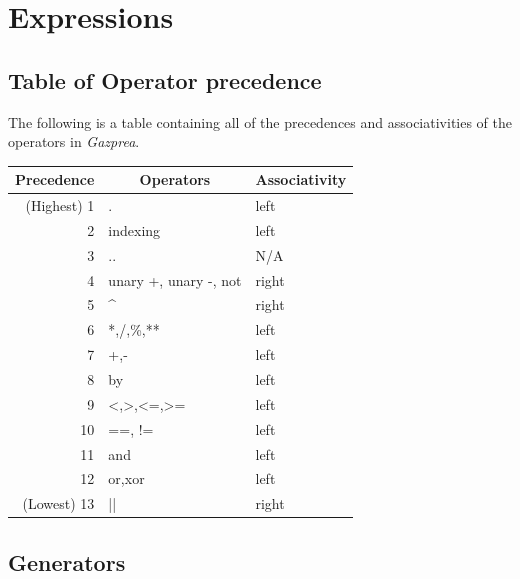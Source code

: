 \documentclass{article}
\begin{document}
\section{Expressions}\label{sec:expressions}

  \subsection{Table of Operator precedence}\label{ssec:operators}

    The following is a table containing all of the precedences and associativities of the operators in
    \textit{Gazprea}.

    \begin{center}
      \begin{tabular}{|r|l|l|}
        \hline
        \textbf{Precedence} &
        \multicolumn{1}{c}{\textbf{Operators}} &
        \textbf{Associativity} \\
        \hline
        (Highest) 1 & .                     & left  \\
        2           & indexing              & left  \\
        3           & ..                    & N/A   \\
        4           & unary +, unary -, not & right \\
        5           & \textasciicircum      & right \\
        6           & *,/,\%,**             & left  \\
        7           & +,-                   & left  \\
        8           & by                    & left  \\
        9           & <,>,<=,>=             & left  \\
        10          & ==, !=                & left  \\
        11          & and                   & left  \\
        12          & or,xor                & left  \\
        (Lowest) 13 & ||                    & right \\
        \hline
      \end{tabular}
    \end{center}

  \subsection{Generators}\label{sec:generators}
\end{document}
